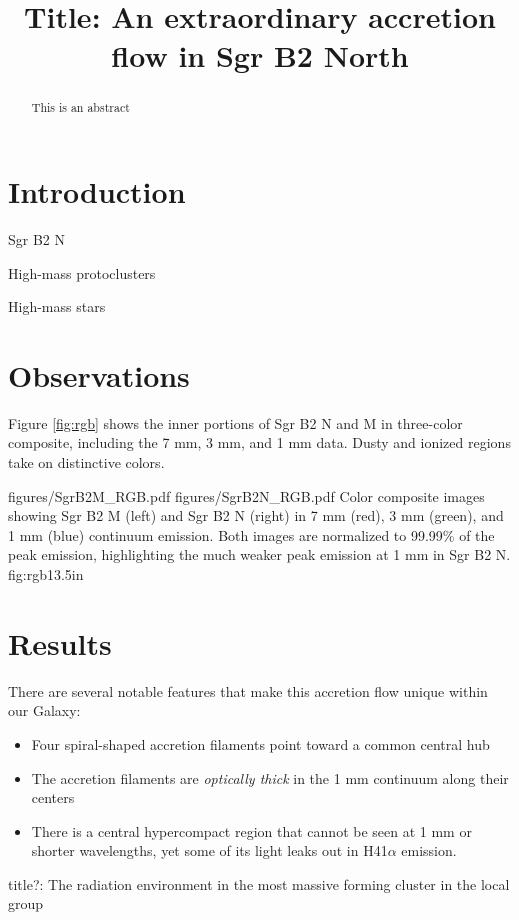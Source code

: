 \documentclass[twocolumn]{aastex61}
\begin{document}
\title{Title: An extraordinary accretion flow in Sgr B2 North}

\begin{abstract}
    This is an abstract
\end{abstract}



\section{Introduction}

Sgr B2 N

High-mass protoclusters

High-mass stars


\section{Observations}


Figure \ref{fig:rgb} shows the inner portions of Sgr B2 N and M in three-color
composite, including the 7 mm, 3 mm, and 1 mm data.  Dusty and ionized regions
take on distinctive colors.

\FigureTwo
{figures/SgrB2M_RGB.pdf}
{figures/SgrB2N_RGB.pdf}
{Color composite images showing Sgr B2 M (left) and Sgr B2 N (right) in 7 mm (red),
3 mm (green), and 1 mm (blue) continuum emission.  Both images are normalized to 99.99\%
of the peak emission, highlighting the much weaker peak emission at 1 mm in Sgr B2 N.}
{fig:rgb}{1}{3.5in}

\section{Results}

There are several notable features that make this accretion flow unique within our Galaxy:

\begin{itemize}
    \item Four spiral-shaped accretion filaments point toward a common central hub
    \item The accretion filaments are \emph{optically thick} in the 1 mm continuum
        along their centers
    \item There is a central hypercompact \hii region that cannot be seen at 1 mm
        or shorter wavelengths, yet some of its light leaks out in H41$\alpha$ emission.
\end{itemize}


title?: The radiation environment in the most massive forming cluster in the local group
\end{document}
